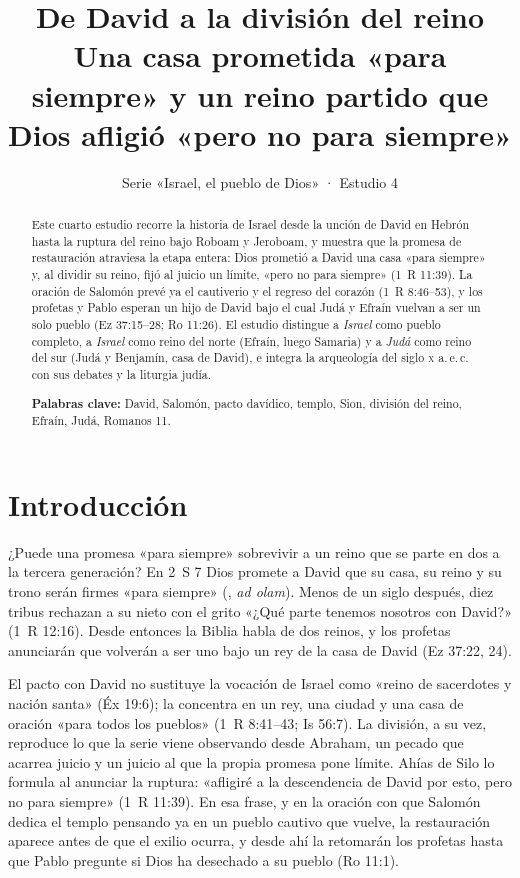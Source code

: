\title{\color{ladrillo}\bfseries De David a la división del reino\\[4pt]\large\color{cafe}\mdseries Una casa prometida «para siempre» y un reino partido que Dios afligió «pero no para siempre»}
\author{}\date{\color{sepia}Serie «Israel, el pueblo de Dios» · Estudio 4}
\newcommand{\pt}[2]{({#1-34},{#2-31})}

\maketitle\thispagestyle{empty}

\begin{abstract}\noindent
Este cuarto estudio recorre la historia de Israel desde la unción de David en Hebrón hasta la ruptura del reino bajo Roboam y Jeroboam, y muestra que la promesa de restauración atraviesa la etapa entera: Dios prometió a David una casa «para siempre» y, al dividir su reino, fijó al juicio un límite, «pero no para siempre» (1~R 11:39). La oración de Salomón prevé ya el cautiverio y el regreso del corazón (1~R 8:46--53), y los profetas y Pablo esperan un hijo de David bajo el cual Judá y Efraín vuelvan a ser un solo pueblo (Ez 37:15--28; Ro 11:26). El estudio distingue a \emph{Israel} como pueblo completo, a \emph{Israel} como reino del norte (Efraín, luego Samaria) y a \emph{Judá} como reino del sur (Judá y Benjamín, casa de David), e integra la arqueología del siglo \textsc{x} a.\,e.\,c. con sus debates y la liturgia judía.
\par\smallskip\noindent\textbf{Palabras clave:} David, Salomón, pacto davídico, templo, Sion, división del reino, Efraín, Judá, Romanos 11.
\end{abstract}

\section{Introducción}

¿Puede una promesa «para siempre» sobrevivir a un reino que se parte en dos a la tercera generación? En 2~S 7 Dios promete a David que su casa, su reino y su trono serán firmes «para siempre» (, \emph{ad olam}). Menos de un siglo después, diez tribus rechazan a su nieto con el grito «¿Qué parte tenemos nosotros con David?» (1~R 12:16). Desde entonces la Biblia habla de dos reinos, y los profetas anunciarán que volverán a ser uno bajo un rey de la casa de David (Ez 37:22, 24).

El pacto con David no sustituye la vocación de Israel como «reino de sacerdotes y nación santa» (Éx 19:6); la concentra en un rey, una ciudad y una casa de oración «para todos los pueblos» (1~R 8:41--43; Is 56:7). La división, a su vez, reproduce lo que la serie viene observando desde Abraham, un pecado que acarrea juicio y un juicio al que la propia promesa pone límite. Ahías de Silo lo formula al anunciar la ruptura: «afligiré a la descendencia de David por esto, pero no para siempre» (1~R 11:39). En esa frase, y en la oración con que Salomón dedica el templo pensando ya en un pueblo cautivo que vuelve, la restauración aparece antes de que el exilio ocurra, y desde ahí la retomarán los profetas hasta que Pablo pregunte si Dios ha desechado a su pueblo (Ro 11:1).

